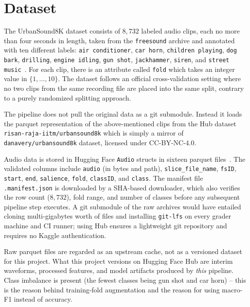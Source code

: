 \documentclass[conference]{IEEEtran}
\newcommand{\dataset}[1]{\texttt{#1}}
\begin{document}
\section{Dataset}
\label{sec:dataset}
\label{ds:urbansound}
The UrbanSound8K dataset consists of \(8{,}732\) labeled audio clips, each no more than four seconds in length, taken from the \dataset{freesound} archive and annotated with ten different labels: \dataset{air conditioner}, \dataset{car horn}, \dataset{children playing}, \dataset{dog bark}, \dataset{drilling}, \dataset{engine idling}, \dataset{gun shot}, \dataset{jackhammer}, \dataset{siren}, and \dataset{street music}~\cite{salamon2014urbansound}.
For each clip, there is an attribute called \dataset{fold} which takes an integer value in \(\{1,\ldots,10\}\).
The dataset follows an official cross-validation setting where no two clips from the same recording file are placed into the same split, contrary to a purely randomized splitting approach.

The pipeline does not pull the original data as a git submodule. Instead it loads the parquet representation of the above-mentioned clips from the Hub dataset \dataset{risan-raja-iitm/urbansound8k} which is simply a mirror of \dataset{danavery/urbansound8k} dataset, licensed under CC-BY-NC-4.0.

Audio data is stored in Hugging Face \texttt{Audio} structs in sixteen parquet files~\cite{huggingface}.
The validated columns include \texttt{audio} (in bytes and path), \texttt{slice\_file\_name}, \texttt{fsID}, \texttt{start}, \texttt{end}, \texttt{salience}, \texttt{fold}, \texttt{classID}, and \texttt{class}.
The manifest file \texttt{.manifest.json} is downloaded by a SHA-based downloader, which also verifies the row count (\(8{,}732\)), fold range, and number of classes before any subsequent pipeline step executes.
A git submodule of the raw archives would have entailed cloning multi-gigabytes worth of files and installing \texttt{git-lfs} on every grader machine and CI runner; using Hub ensures a lightweight git repository and requires no Kaggle authentication.

Raw parquet files are regarded as an upstream cache, not as a versioned dataset for this project.
What this project versions on Hugging Face Hub are interim waveforms, processed features, and model artifacts produced by \emph{this} pipeline.
Class imbalance is present (the fewest classes being gun shot and car horn) – this is the reason behind training-fold augmentation and the reason for using macro-F1 instead of accuracy.
\end{document}
